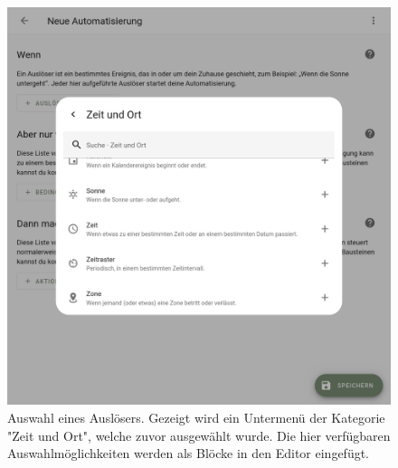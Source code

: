 \begin{figure}[!ht]
\begin{minipage}[t]{\hascwidth}
    \includegraphics[width=\linewidth]{assets/hassio-automation-trigger-select-2.png}
    \caption[Auswahl eines Auslösers in Home Assistant]{Auswahl eines Auslösers. Gezeigt wird ein Untermenü der Kategorie "Zeit und Ort", welche zuvor ausgewählt wurde. Die hier verfügbaren Auswahlmöglichkeiten werden als Blöcke in den Editor eingefügt.}
    \label{figure:hassio-automation-trigger-select-2}
  \end{minipage}
\end{figure}

